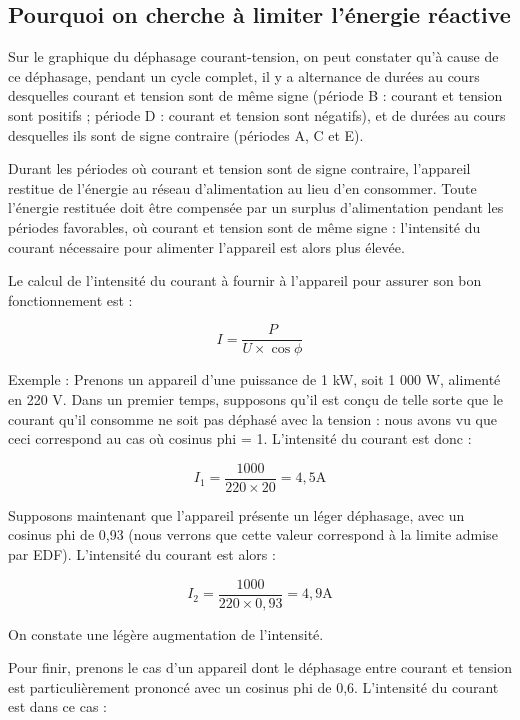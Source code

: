 \subsection{Pourquoi on cherche à limiter l’énergie réactive}

Sur le graphique du déphasage courant-tension, on peut constater qu’à cause de ce déphasage, pendant un cycle complet, il y a alternance de durées au cours desquelles courant et tension sont de même signe (période B : courant et tension sont positifs ; période D : courant et tension sont négatifs), et de durées au cours desquelles ils sont de signe contraire (périodes A, C et E).
\vspace{0.3cm}

Durant les périodes où courant et tension sont de signe contraire, l’appareil restitue de l’énergie au réseau d’alimentation au lieu d’en consommer. Toute l’énergie restituée doit être compensée par un surplus d’alimentation pendant les périodes favorables, où courant et tension sont de même signe : l’intensité du courant nécessaire pour alimenter l’appareil est alors plus élevée.
\vspace{0.3cm}

Le calcul de l’intensité du courant à fournir à l’appareil pour assurer son bon fonctionnement est :

\[I = \frac{P}{U \times \cos \phi}\]


Exemple :
Prenons un appareil d’une puissance de 1 kW, soit 1 000 W, alimenté en 220 V. Dans un premier temps, supposons qu’il est conçu de telle sorte que le courant qu’il consomme ne soit pas déphasé avec la tension : nous avons vu que ceci correspond au cas où cosinus phi = 1. L’intensité du courant est donc : 

\[I_{ 1} = \frac{1000}{220 \times 20} = 4,5 \text{A} \]


Supposons maintenant que l’appareil présente un léger déphasage, avec un cosinus phi de 0,93 (nous verrons que cette valeur correspond à la limite admise par EDF). L’intensité du courant est alors :

\[I_{2} = \frac{1000}{220 \times 0,93} = 4,9 \text{A} \] 
	
On constate une légère augmentation de l’intensité.

\vspace{0.3cm}

Pour finir, prenons le cas d’un appareil dont le déphasage entre courant et tension est particulièrement prononcé avec un cosinus phi de 0,6. L’intensité du courant est dans ce cas :


